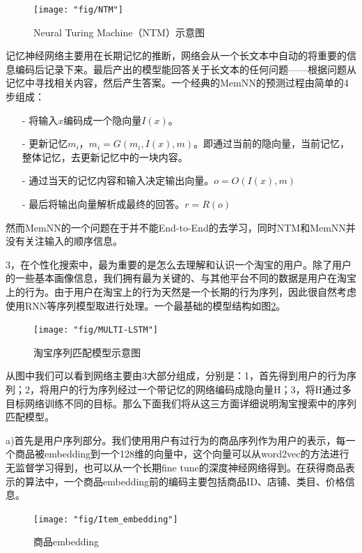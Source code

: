 \begin{figure}[h]
	\centering
	\texttt{[image: "fig/NTM"]}
	\caption{Neural Turing Machine（NTM）示意图}
	\label{fig:NTM}
\end{figure}

记忆神经网络\cite{8}主要用在长期记忆的推断，网络会从一个长文本中自动的将重要的信息编码后记录下来。最后产出的模型能回答关于长文本的任何问题——根据问题从记忆中寻找相关内容，然后产生答案。一个经典的MemNN的预测过程由简单的4步组成：
\begin{itemize}
	\item[-] 将输入$x$编码成一个隐向量$I(x)$。
	\item[-] 更新记忆$m_i$，$m_i=G(m_i, I(x), m)$。即通过当前的隐向量，当前记忆，整体记忆，去更新记忆中的一块内容。
	\item[-] 通过当天的记忆内容和输入决定输出向量。$o = O(I(x),m)$
	\item[-] 最后将输出向量解析成最终的回答。$r = R(o)$
\end{itemize}
然而MemNN的一个问题在于并不能End-to-End的去学习，同时NTM和MemNN并没有关注输入的顺序信息。

3，在个性化搜索中，最为重要的是怎么去理解和认识一个淘宝的用户。除了用户的一些基本画像信息，我们拥有最为关键的、与其他平台不同的数据是用户在淘宝上的行为。由于用户在淘宝上的行为天然是一个长期的行为序列，因此很自然考虑使用RNN等序列模型取进行处理。一个最基础的模型结构如图\ref{fig:MULTI-LSTM}。

\begin{figure}[h]
	\centering
	\texttt{[image: "fig/MULTI-LSTM"]}
	\caption{淘宝序列匹配模型示意图}
	\label{fig:MULTI-LSTM}
\end{figure}

从图中我们可以看到网络主要由3大部分组成，分别是：1，首先得到用户的行为序列；2，将用户的行为序列经过一个带记忆的网络编码成隐向量H；3，将H通过多目标网络训练不同的目标。那么下面我们将从这三方面详细说明淘宝搜索中的序列匹配模型。

a)首先是用户序列部分。我们使用用户有过行为的商品序列作为用户的表示，每一个商品被embedding到一个128维的向量中，这个向量可以从word2vec的方法进行无监督学习得到，也可以从一个长期fine tune的深度神经网络得到。在获得商品表示的算法中，一个商品embedding前的编码主要包括商品ID、店铺、类目、价格信息。

\begin{figure}[h]
	\centering
	\texttt{[image: "fig/Item\_embedding"]}
	\caption{商品embedding}
	\label{fig:Item_embedding}
\end{figure}

